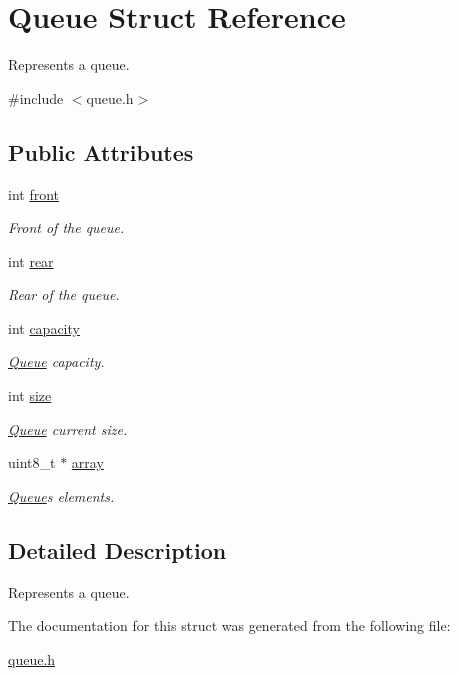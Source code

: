 \hypertarget{struct_queue}{}\section{Queue Struct Reference}
\label{struct_queue}


Represents a queue.  




{\ttfamily \#include $<$queue.\+h$>$}

\subsection*{Public Attributes}
\begin{DoxyCompactItemize}
\item 
int \mbox{\hyperlink{group__queue_gaa14801d5c5fea47f3d08483d103e0b57}{front}}
\begin{DoxyCompactList}\small\item\em Front of the queue. \end{DoxyCompactList}\item 
int \mbox{\hyperlink{group__queue_ga8303807ce298d63d958f7e5765034d70}{rear}}
\begin{DoxyCompactList}\small\item\em Rear of the queue. \end{DoxyCompactList}\item 
int \mbox{\hyperlink{group__queue_ga003d8f2aacb10aa84f38ff89e93ccf74}{capacity}}
\begin{DoxyCompactList}\small\item\em \mbox{\hyperlink{struct_queue}{Queue}} capacity. \end{DoxyCompactList}\item 
int \mbox{\hyperlink{group__queue_gac7d9701d244e3ba255ef8556e0562dc6}{size}}
\begin{DoxyCompactList}\small\item\em \mbox{\hyperlink{struct_queue}{Queue}} current size. \end{DoxyCompactList}\item 
uint8\+\_\+t $\ast$ \mbox{\hyperlink{group__queue_ga39d406adce9a616cce11f7c124593c94}{array}}
\begin{DoxyCompactList}\small\item\em \mbox{\hyperlink{struct_queue}{Queue}}\textquotesingle{}s elements. \end{DoxyCompactList}\end{DoxyCompactItemize}


\subsection{Detailed Description}
Represents a queue. 

The documentation for this struct was generated from the following file\+:\begin{DoxyCompactItemize}
\item 
\mbox{\hyperlink{queue_8h}{queue.\+h}}\end{DoxyCompactItemize}
